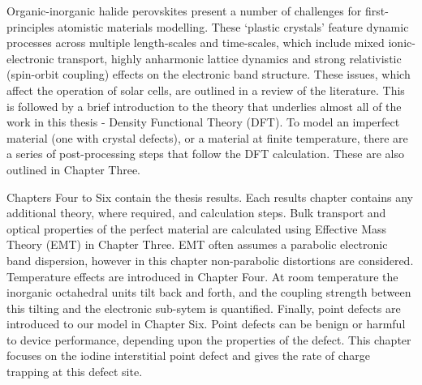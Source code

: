 Organic-inorganic halide perovskites present a number of challenges for first-principles atomistic materials modelling. These `plastic crystals' feature dynamic processes across multiple length-scales and time-scales, which include mixed ionic-electronic transport, highly anharmonic lattice dynamics and strong relativistic (spin-orbit coupling) effects on the electronic band structure.
These issues, which affect the operation of solar cells, are outlined in a review of the literature. 
This is followed by a brief introduction to the theory that underlies almost all of the work in this thesis - Density Functional Theory (DFT). 
To model an imperfect material (one with crystal defects), or a material at finite temperature, there are a series of post-processing steps that follow the DFT calculation. These are also outlined in Chapter Three.

Chapters Four to Six contain the thesis results. Each results chapter contains any additional theory, where required, and calculation steps. Bulk transport and optical properties of the perfect material are calculated using Effective Mass Theory (EMT) in Chapter Three. 
EMT often assumes a parabolic electronic band dispersion, however in this chapter non-parabolic distortions are considered.
Temperature effects are introduced in Chapter Four. 
At room temperature the inorganic octahedral  units tilt back and forth, and the coupling strength between this tilting and the electronic sub-sytem is quantified.
Finally, point defects are introduced to our model in Chapter Six. Point defects can be benign or harmful to device performance, depending upon the properties of the defect. This chapter focuses on the iodine interstitial point defect and gives the rate of charge trapping at this defect site.


